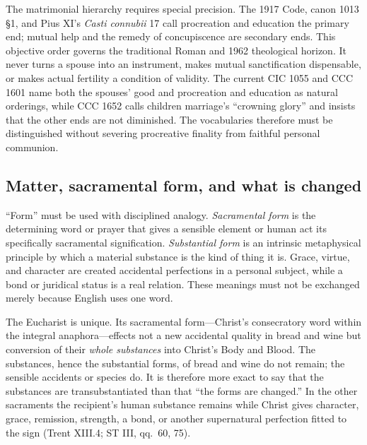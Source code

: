 The matrimonial hierarchy requires special precision. The 1917 Code, canon 1013 \S1, and Pius XI's \emph{Casti connubii} 17 call procreation and education the primary end; mutual help and the remedy of concupiscence are secondary ends. This objective order governs the traditional Roman and 1962 theological horizon. It never turns a spouse into an instrument, makes mutual sanctification dispensable, or makes actual fertility a condition of validity. The current CIC 1055 and CCC 1601 name both the spouses' good and procreation and education as natural orderings, while CCC 1652 calls children marriage's ``crowning glory'' and insists that the other ends are not diminished. The vocabularies therefore must be distinguished without severing procreative finality from faithful personal communion.

\subsection{Matter, sacramental form, and what is changed}

``Form'' must be used with disciplined analogy. \emph{Sacramental form} is the determining word or prayer that gives a sensible element or human act its specifically sacramental signification. \emph{Substantial form} is an intrinsic metaphysical principle by which a material substance is the kind of thing it is. Grace, virtue, and character are created accidental perfections in a personal subject, while a bond or juridical status is a real relation. These meanings must not be exchanged merely because English uses one word.

The Eucharist is unique. Its sacramental form---Christ's consecratory word within the integral anaphora---effects not a new accidental quality in bread and wine but conversion of their \emph{whole substances} into Christ's Body and Blood. The substances, hence the substantial forms, of bread and wine do not remain; the sensible accidents or species do. It is therefore more exact to say that the substances are transubstantiated than that ``the forms are changed.'' In the other sacraments the recipient's human substance remains while Christ gives character, grace, remission, strength, a bond, or another supernatural perfection fitted to the sign (Trent XIII.4; ST III, qq.~60, 75).

